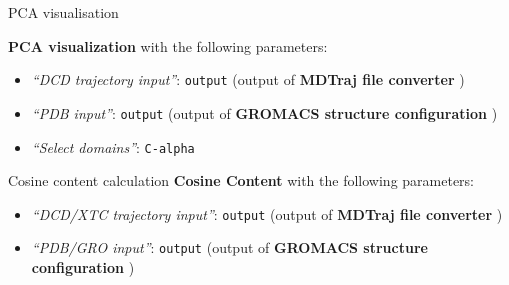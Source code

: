 \documentclass[twocolumn]{bmcart}%
\providecommand{\tightlist}{%
  \setlength{\itemsep}{0pt}\setlength{\parskip}{0pt}}
\begin{document}
\begin{handson_box_colour}{PCA visualisation}

  \textbf{PCA visualization} with the following parameters:

  \begin{itemize}
  \tightlist
  \item
    \emph{``DCD trajectory input''}: \texttt{output} (output of
    \textbf{MDTraj file converter} )
  \item
    \emph{``PDB input''}: \texttt{output} (output of \textbf{GROMACS
    structure configuration} )
  \item
    \emph{``Select domains''}: \texttt{C-alpha}
  \end{itemize}



\end{handson_box_colour}
\begin{handson_box_colour}{Cosine content calculation}
  \textbf{Cosine Content} with the following parameters:

  \begin{itemize}
  \tightlist
  \item
    \emph{``DCD/XTC trajectory input''}: \texttt{output} (output of
    \textbf{MDTraj file converter} )
  \item
    \emph{``PDB/GRO input''}: \texttt{output} (output of \textbf{GROMACS
    structure configuration} )
  \end{itemize}



\end{handson_box_colour}
\end{document}
